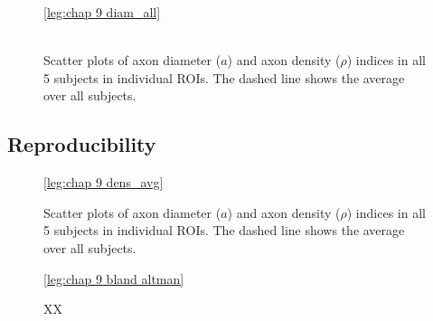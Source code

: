 \begin{figure}[ht]
	\centering
	\ref{leg:chap 9 diam_all}
	\\	
	\\
	\caption{Scatter plots of axon diameter ($a$) and axon density ($\rho$) indices in all 5 subjects in individual ROIs. The dashed line shows the average over all subjects.}
	\label{fig:chap9 scan rescan scatterplots per subject}
\end{figure}

\subsection*{Reproducibility}
\begin{figure}[ht]
	\centering
	\ref{leg:chap 9 dens_avg}\\	
	\caption{Scatter plots of axon diameter ($a$) and axon density ($\rho$) indices in all 5 subjects in individual ROIs. The dashed line shows the average over all subjects.}
	\label{fig:chap9 scan rescan scatterplots per subject}
\end{figure}

\begin{figure}[ht]
	\centering
	\ref{leg:chap 9 bland altman}	
	\caption{XX}
	\label{fig:chap9 bland altman plot}	
\end{figure}	

